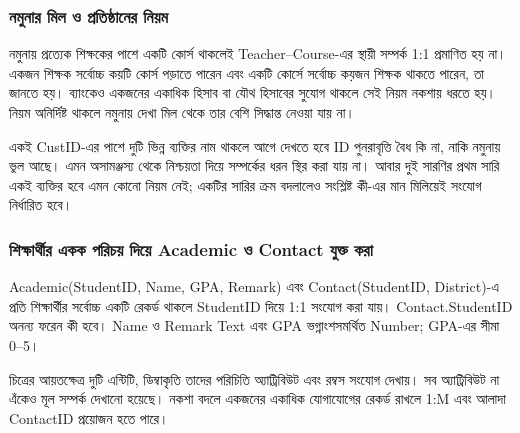 \subsubsection{নমুনার মিল ও প্রতিষ্ঠানের নিয়ম}
নমুনায় প্রত্যেক শিক্ষকের পাশে একটি কোর্স থাকলেই Teacher–Course-এর স্থায়ী সম্পর্ক 1:1 প্রমাণিত হয় না। একজন শিক্ষক সর্বোচ্চ কয়টি কোর্স পড়াতে পারেন এবং একটি কোর্সে সর্বোচ্চ কয়জন শিক্ষক থাকতে পারেন, তা জানতে হয়। ব্যাংকেও একজনের একাধিক হিসাব বা যৌথ হিসাবের সুযোগ থাকলে সেই নিয়ম নকশায় ধরতে হয়। নিয়ম অনির্দিষ্ট থাকলে নমুনায় দেখা মিল থেকে তার বেশি সিদ্ধান্ত নেওয়া যায় না।

একই CustID-এর পাশে দুটি ভিন্ন ব্যক্তির নাম থাকলে আগে দেখতে হবে ID পুনরাবৃত্তি বৈধ কি না, নাকি নমুনায় ভুল আছে। এমন অসামঞ্জস্য থেকে নিশ্চয়তা দিয়ে সম্পর্কের ধরন স্থির করা যায় না। আবার দুই সারণির প্রথম সারি একই ব্যক্তির হবে এমন কোনো নিয়ম নেই; একটির সারির ক্রম বদলালেও সংশ্লিষ্ট কী-এর মান মিলিয়েই সংযোগ নির্ধারিত হবে।










\subsubsection{শিক্ষার্থীর একক পরিচয় দিয়ে Academic ও Contact যুক্ত করা}
Academic(StudentID, Name, GPA, Remark) এবং Contact(StudentID, District)-এ প্রতি শিক্ষার্থীর সর্বোচ্চ একটি রেকর্ড থাকলে StudentID দিয়ে 1:1 সংযোগ করা যায়। Contact.StudentID অনন্য ফরেন কী হবে। Name ও Remark Text এবং GPA ভগ্নাংশসমর্থিত Number; GPA-এর সীমা 0--5।
\begin{flushleft}\centering\captionsetup{justification=centering}\begin{minipage}{\linewidth}\raggedright\small
{}
\end{minipage}\end{flushleft}
চিত্রের আয়তক্ষেত্র দুটি এন্টিটি, ডিম্বাকৃতি তাদের পরিচিতি অ্যাট্রিবিউট এবং রম্বস সংযোগ দেখায়। সব অ্যাট্রিবিউট না এঁকেও মূল সম্পর্ক দেখানো হয়েছে। নকশা বদলে একজনের একাধিক যোগাযোগের রেকর্ড রাখলে 1:M এবং আলাদা ContactID প্রয়োজন হতে পারে।

